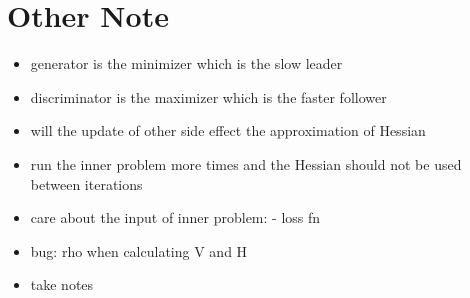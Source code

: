 \documentclass{article}
\begin{document}
\section{Other Note}
\begin{itemize}
    \item generator is the minimizer which is the slow leader
    \item discriminator is the maximizer which is the faster follower
    \item will the update of other side effect the approximation of Hessian
    \item run the inner problem more times and the Hessian should not be used between iterations
    \item care about the input of inner problem: - loss fn
    \item bug: rho when calculating V and H
    \item take notes
\end{itemize}
\end{document}
